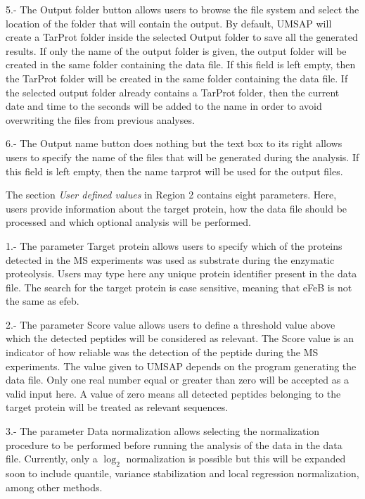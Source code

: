 \num{5}.- The Output folder\label{par:enzdigOutF} button allows users to browse the file system and select the location of the folder that will contain the output. By default, UMSAP will create a TarProt folder inside the selected Output folder to save all the generated results. If only the name of the output folder is given, the output folder will be created in the same folder containing the data file. If this field is left empty, then the TarProt folder will be created in the same folder containing the data file. If the selected output folder already contains a TarProt folder, then the current date and time to the seconds will be added to the name in order to avoid overwriting the files from previous analyses.

\num{6}.- The Output name button does nothing but the text box to its right allows users to specify the name of the files that will be generated during the analysis. If this field is left empty, then the name tarprot will be used for the output files. 

The section \textit{User defined values} in Region \num{2} contains eight parameters. Here, users provide information about the target protein, how the data file should be processed and which optional analysis will be performed.

\num{1}.- The parameter Target protein\label{par:subsprot} allows users to specify which of the proteins detected in the MS experiments was used as substrate during the enzymatic proteolysis. Users may type here any unique protein identifier present in the data file. The search for the target protein is case sensitive, meaning that eFeB is not the same as efeb.

\num{2}.- The parameter Score value\label{par:scorevalueenzdig} allows users to define a threshold value above which the detected peptides will be considered as relevant. The Score value is an indicator of how reliable was the detection of the peptide during the MS experiments. The value given to UMSAP depends on the program generating the data file. Only one real number equal or greater than zero will be accepted as a valid input here. A value of zero means all detected peptides belonging to the target protein will be treated as relevant sequences.

\num{3}.- The parameter Data normalization allows selecting the normalization procedure to be performed before running the analysis of the data in the data file. Currently, only a $\log_2$ normalization is possible but this will be expanded soon to include quantile, variance stabilization and local regression normalization, among other methods. 

